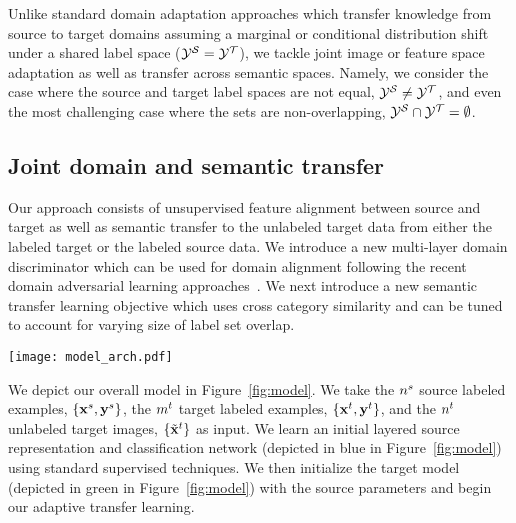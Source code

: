 Unlike standard domain adaptation approaches which transfer knowledge from source to target domains assuming a marginal or conditional distribution shift under a shared label space ($\mathcal{Y}^{\mathcal{S}} = \mathcal{Y}^{\mathcal{T}}$), we tackle joint image or feature space adaptation as well as transfer across semantic spaces. Namely, we consider the case where the source and target label spaces are not equal, $\mathcal{Y}^{\mathcal{S}} \neq \mathcal{Y}^{\mathcal{T}}$, and even the most challenging case where the sets are non-overlapping, $\mathcal{Y}^{\mathcal{S}} \cap \mathcal{Y}^{\mathcal{T}} = \emptyset$.

\subsection{Joint domain and semantic transfer}
Our approach consists of unsupervised feature alignment between source and target as well as semantic transfer to the unlabeled target data from either the labeled target or the labeled source data. We introduce a new multi-layer domain discriminator which can be used for domain alignment following the recent domain adversarial learning approaches~\cite{ganin2016domain,tzeng2017adversarial}. We next introduce a new semantic transfer learning objective which uses cross category similarity and can be tuned to account for varying size of label set overlap. 

\begin{figure*}[t]
\centering
\texttt{[image: model\_arch.pdf]}
\caption{Our proposed learning framework for joint transfer across domains and semantic transfer across source and target and across target labeled to unlabeled data. We introduce a  domain discriminator which aligns source and target representations across multiple layers of the network through domain adversarial learning.  We enable semantic transfer through minimizing the entropy of the pairwise similarity between unlabeled and labeled target images and use the temperature of the softmax over the similarity vector to allow for non-overlapping label spaces.
}
\label{fig:model}
\end{figure*}

We depict our overall model in Figure~\ref{fig:model}. We take the $n^{s}$ source labeled examples, $\{\mathbf{x}^{s}, \mathbf{y}^{s}\}$, the $m^{t}$ target labeled examples, $\{\mathbf{x}^{t}, \mathbf{y}^{t}\}$, and the $n^{t}$ unlabeled target images, $\{\tilde{\mathbf{x}}^{t}\}$ as input. We learn an initial layered source representation and classification network (depicted in blue in Figure~\ref{fig:model}) using standard supervised techniques. We then initialize the target model (depicted in green in Figure~\ref{fig:model}) with the source parameters and begin our adaptive transfer learning. 

